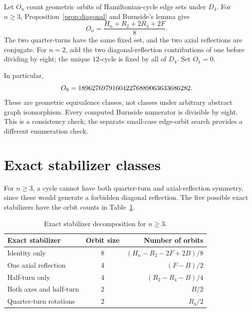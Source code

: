 \documentclass[12pt]{amsart}
\begin{document}
Let $O_n$ count geometric orbits of Hamiltonian-cycle edge sets under $D_4$.
For $n\geq3$, Proposition~\ref{prop:diagonal} and Burnside's lemma give
\begin{equation}\label{eq:burnside}
O_n=\frac{H_n+R_2+2R_4+2F}{8}.
\end{equation}
The two quarter-turns have the same fixed set, and the two axial reflections
are conjugate. For $n=2$, add the two diagonal-reflection contributions of
one before dividing by eight; the unique $12$-cycle is fixed by all of $D_4$.
Set $O_1=0$.

\begin{table}[htbp]
\centering\footnotesize
\setlength{\tabcolsep}{4pt}

\caption{Fixed edge-set counts for the punctured grids. $F$ refers to one
specified axial reflection; $B$ requires both.}
\label{tab:fixed}
\end{table}
\begin{table}[htbp]
\centering\small

\caption{Geometric orbits under all eight symmetries of the square.}
\label{tab:orbits}
\end{table}
In particular,
\[
O_8=189627697916042276889063633686282.
\]
These are geometric equivalence classes, not classes under arbitrary
abstract graph isomorphism. Every computed Burnside numerator is divisible
by eight. This is a consistency check; the separate small-case edge-orbit
search provides a different enumeration check.

\section{Exact stabilizer classes}
For $n\geq3$, a cycle cannot have both quarter-turn and axial-reflection
symmetry, since these would generate a forbidden diagonal reflection.
The five possible exact stabilizers have the orbit counts in
Table~\ref{tab:classformulas}.
\begin{table}[htbp]
\centering\small
\begin{tabular}{lcr}
\toprule
Exact stabilizer & Orbit size & Number of orbits\\
\midrule
Identity only & 8 & $(H_n-R_2-2F+2B)/8$\\
One axial reflection & 4 & $(F-B)/2$\\
Half-turn only & 4 & $(R_2-R_4-B)/4$\\
Both axes and half-turn & 2 & $B/2$\\
Quarter-turn rotations & 2 & $R_4/2$\\
\bottomrule
\end{tabular}
\caption{Exact stabilizer decomposition for $n\geq3$.}
\label{tab:classformulas}
\end{table}
\end{document}
